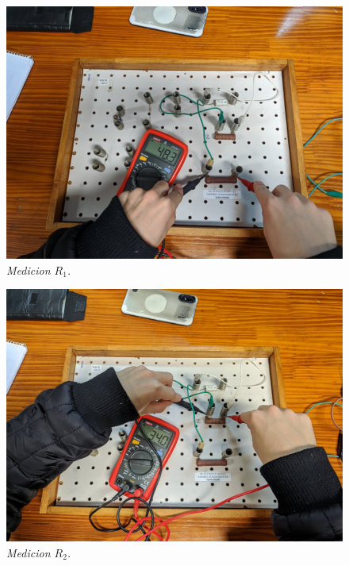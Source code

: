\documentclass[12pt]{report}
\begin{document}
\noindent
\begin{figure}[h]
  \centering
  \begin{minipage}[h]{0.3\textwidth}
    \centering
    \includegraphics[width=1\textwidth]{./pictures/SERIE_R1.jpg}
    \textit{Medicion $R_1$.}
  \end{minipage}\hskip 5mm
  \begin{minipage}[h]{0.3\textwidth}
    \centering
    \includegraphics[width=1\textwidth]{./pictures/SERIE_R2.jpg}
    \textit{Medicion $R_2$.}
  \end{minipage}\hskip 5mm
  \begin{minipage}[h]{0.3\textwidth}
    \centering

\end{minipage}
\end{figure}
\end{document}
